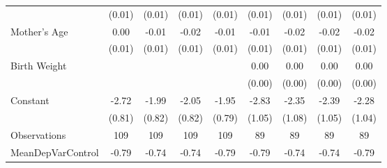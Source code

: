{\begin{tabular}{l*{8}{c}}
                    &      (0.01)         &      (0.01)         &      (0.01)         &      (0.01)         &      (0.01)         &      (0.01)         &      (0.01)         &      (0.01)         \\
[1em]
Mother's Age        &        0.00         &       -0.01         &       -0.02         &       -0.01         &       -0.01         &       -0.02         &       -0.02\sym{*}  &       -0.02         \\
                    &      (0.01)         &      (0.01)         &      (0.01)         &      (0.01)         &      (0.01)         &      (0.01)         &      (0.01)         &      (0.01)         \\
[1em]
Birth Weight        &                     &                     &                     &                     &        0.00         &        0.00         &        0.00         &        0.00         \\
                    &                     &                     &                     &                     &      (0.00)         &      (0.00)         &      (0.00)         &      (0.00)         \\
[1em]
Constant            &       -2.72\sym{***}&       -1.99\sym{**} &       -2.05\sym{**} &       -1.95\sym{**} &       -2.83\sym{***}&       -2.35\sym{**} &       -2.39\sym{**} &       -2.28\sym{**} \\
                    &      (0.81)         &      (0.82)         &      (0.82)         &      (0.79)         &      (1.05)         &      (1.08)         &      (1.05)         &      (1.04)         \\
\hline
Observations        &         109         &         109         &         109         &         109         &          89         &          89         &          89         &          89         \\
MeanDepVarControl   &       -0.79         &       -0.74         &       -0.74         &       -0.79         &       -0.79         &       -0.74         &       -0.74         &       -0.79         \\
\hline\hline
\end{tabular}
}
